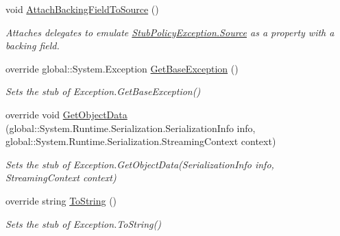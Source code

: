 \begin{DoxyCompactItemize}
void \hyperlink{class_system_1_1_security_1_1_policy_1_1_fakes_1_1_stub_policy_exception_a004574981b812226e246e09abedbbfa7}{Attach\-Backing\-Field\-To\-Source} ()
\begin{DoxyCompactList}\small\item\em Attaches delegates to emulate \hyperlink{class_system_1_1_security_1_1_policy_1_1_fakes_1_1_stub_policy_exception_ac433cf6dc6851c5aff3918687f0853d8}{Stub\-Policy\-Exception.\-Source} as a property with a backing field.\end{DoxyCompactList}\item 
override global\-::\-System.\-Exception \hyperlink{class_system_1_1_security_1_1_policy_1_1_fakes_1_1_stub_policy_exception_a2e093d423eb4b0a8bae0d5b7fd46f00e}{Get\-Base\-Exception} ()
\begin{DoxyCompactList}\small\item\em Sets the stub of Exception.\-Get\-Base\-Exception()\end{DoxyCompactList}\item 
override void \hyperlink{class_system_1_1_security_1_1_policy_1_1_fakes_1_1_stub_policy_exception_a74e8f0888db9db10f86baaa85bb31909}{Get\-Object\-Data} (global\-::\-System.\-Runtime.\-Serialization.\-Serialization\-Info info, global\-::\-System.\-Runtime.\-Serialization.\-Streaming\-Context context)
\begin{DoxyCompactList}\small\item\em Sets the stub of Exception.\-Get\-Object\-Data(\-Serialization\-Info info, Streaming\-Context context)\end{DoxyCompactList}\item 
override string \hyperlink{class_system_1_1_security_1_1_policy_1_1_fakes_1_1_stub_policy_exception_a316795c7b8912a0840a1b08395b04e6c}{To\-String} ()
\begin{DoxyCompactList}\small\item\em Sets the stub of Exception.\-To\-String()\end{DoxyCompactList}\end{DoxyCompactItemize}
